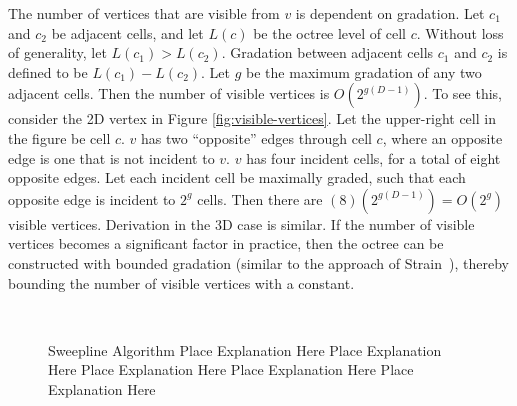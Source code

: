 \documentclass{egpubl}
\begin{document}
The number of vertices that are visible from $v$ is dependent on gradation.  Let $c_1$ and $c_2$ be adjacent cells, and let $L(c)$ be the octree level of cell $c$.  Without loss of generality, let $L(c_1) > L(c_2)$.  Gradation between adjacent cells $c_1$ and $c_2$ is defined to be $L(c_1) - L(c_2)$.  Let $g$ be the maximum gradation of any two adjacent cells.  Then the number of visible vertices is $O(2^{g(D-1)})$.  To see this, consider the 2D vertex in Figure \ref{fig:visible-vertices}.  Let the upper-right cell in the figure be cell $c$.  $v$ has two ``opposite'' edges through cell $c$, where an opposite edge is one that is not incident to $v$.  $v$ has four incident cells, for a total of eight opposite edges.  Let each incident cell be maximally graded, such that each opposite edge is incident to $2^g$ cells.  Then there are $(8)(2^{g(D-1)}) = O(2^g)$ visible vertices.  Derivation in the 3D case is similar.  If the number of visible vertices becomes a significant factor in practice, then the octree can be constructed with bounded gradation (similar to the approach of Strain~), thereby bounding the number of visible vertices with a constant.

\begin{figure}
  \centering
   \\
  \caption{Sweepline Algorithm
    \protect{} Place Explanation Here
    \protect{} Place Explanation Here
    \protect{} Place Explanation Here
    \protect{}  %
    \protect{} Place Explanation Here
    \protect{} Place Explanation Here
  }
  \label{fig:wavefront}
\end{figure}
\end{document}
